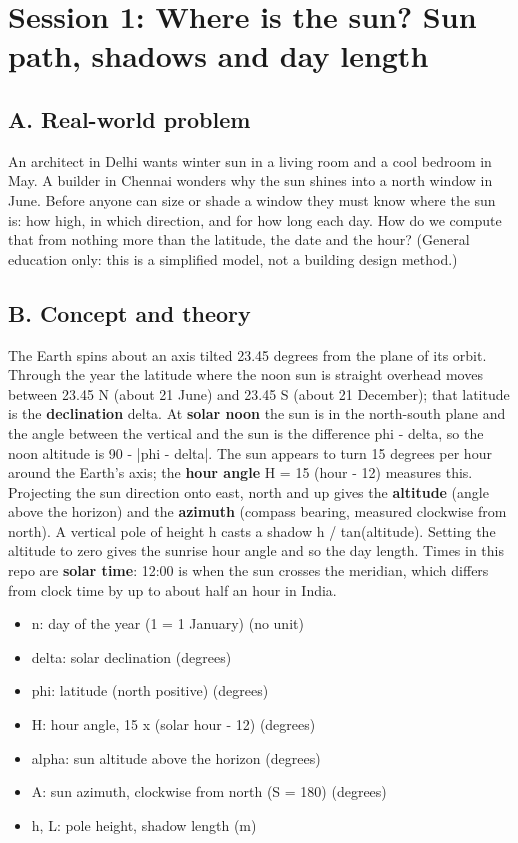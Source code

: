 \documentclass[11pt,a4paper]{article}
\begin{document}
\section{Session 1: Where is the sun? Sun path, shadows and day length}

\subsection*{A. Real-world problem}
An architect in Delhi wants winter sun in a living room and a cool bedroom in May. A builder in Chennai wonders why the sun shines into a north window in June. Before anyone can size or shade a window they must know where the sun is: how high, in which direction, and for how long each day. How do we compute that from nothing more than the latitude, the date and the hour? (General education only: this is a simplified model, not a building design method.)

\subsection*{B. Concept and theory}
The Earth spins about an axis tilted 23.45 degrees from the plane of its orbit. Through the year the latitude where the noon sun is straight overhead moves between 23.45 N (about 21 June) and 23.45 S (about 21 December); that latitude is the \textbf{declination} delta. At \textbf{solar noon} the sun is in the north-south plane and the angle between the vertical and the sun is the difference phi - delta, so the noon altitude is 90 - |phi - delta|. The sun appears to turn 15 degrees per hour around the Earth's axis; the \textbf{hour angle} H = 15 (hour - 12) measures this. Projecting the sun direction onto east, north and up gives the \textbf{altitude} (angle above the horizon) and the \textbf{azimuth} (compass bearing, measured clockwise from north). A vertical pole of height h casts a shadow h / tan(altitude). Setting the altitude to zero gives the sunrise hour angle and so the day length. Times in this repo are \textbf{solar time}: 12:00 is when the sun crosses the meridian, which differs from clock time by up to about half an hour in India.

\begin{itemize}[nosep]
\item n: day of the year (1 = 1 January) (no unit)
\item delta: solar declination (degrees)
\item phi: latitude (north positive) (degrees)
\item H: hour angle, 15 x (solar hour - 12) (degrees)
\item alpha: sun altitude above the horizon (degrees)
\item A: sun azimuth, clockwise from north (S = 180) (degrees)
\item h, L: pole height, shadow length (m)
\end{itemize}
\end{document}
